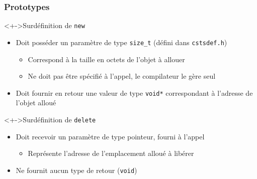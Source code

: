 \begin{frame}
\frametitle{Prototypes}
\begin{exampleblock}<+->{Surdéfinition de \texttt{new}}
	\begin{itemize}[<+->]
	\item Doit posséder un paramètre de type \texttt{size\_t} (défini dans \texttt{cstsdef.h})
		\begin{itemize}
		\item Correspond à la taille en octets de l'objet à allouer
		\item Ne doit pas être spécifié à l'appel, le compilateur le gère seul
		\end{itemize}
	\item Doit fournir en retour une valeur de type \lstinline|void*| correspondant à l'adresse de l'objet alloué
	\end{itemize}
\end{exampleblock}
\begin{exampleblock}<+->{Surdéfinition de \texttt{delete}}
	\begin{itemize}[<+->]
	\item Doit recevoir un paramètre de type pointeur, fourni à l'appel
		\begin{itemize}
		\item Représente l'adresse de l'emplacement alloué à libérer
		\end{itemize}
	\item Ne fournit aucun type de retour (\lstinline|void|)
	\end{itemize}
\end{exampleblock}
\end{frame}

